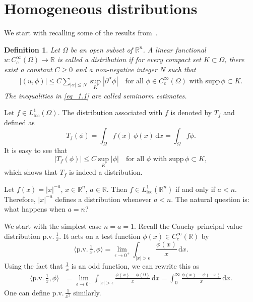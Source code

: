 \documentclass[11pt]{article}
\newtheorem{definition}[theorem]{Definition}
\newcommand{\ssc}[1]{\begin{quotation}\textbf{\color{blue}Suman's comment:\
		}{\color{blue}\textit{#1}}\end{quotation}}
\begin{document}
\section{Homogeneous distributions}\label{appen_homo_dis}
We start with recalling some of the results from~\cite{Dorina,Hormander_I,Taylor_book}.
\begin{definition}\label{def_distribution}
Let $\Omega$ be an open subset of $\mathbb{R}^n$. A linear functional 
$u : C_c^\infty(\Omega) \to \mathbb{R}$ 
is called a \emph{distribution} if for every compact set 
$K \subset \Omega$, there exist a constant $C \ge 0$ 
and a non-negative integer $N$ such that
\begin{align}\label{eq_1.1}
	|(u, \phi)| \le C \sum_{|\alpha|\le N} \sup_{K} | \partial^{\alpha} \phi | 
	\quad \text{for all } \phi \in C_c^\infty(\Omega) \text{ with } \mathrm{supp}\, \phi \subset K.
\end{align}
The inequalities in \eqref{eq_1.1} are called \emph{seminorm estimates}.
\end{definition}
\noindent Let $f \in L^1_{\mathrm{loc}}(\Omega)$. The distribution associated with $f$ is denoted by $T_f$ and defined as 
\begin{equation}\label{def_T_f}
	T_f(\phi) = \int_{\Omega} f(x)\, \phi(x) \, \mathrm{d}x 
	= \int_{\Omega} f \phi.
\end{equation}
It is easy to see that 
\begin{equation}
	|T_f(\phi)| \le C \sup_{K} |\phi| 
	\quad \text{for all } \phi \text{ with } \mathrm{supp}\, \phi \subset K,
\end{equation}
which shows that $T_f$ is indeed a distribution.

Let $f(x) = |x|^{-a}$, $x \in \mathbb{R}^n$, $a \in \mathbb{R}$. 
Then $f \in L^1_{\mathrm{loc}}(\mathbb{R}^n)$ if and only if $a < n$. 
Therefore, $|x|^{-a}$ defines a distribution whenever $a < n$. 
The natural question is: what happens when $a = n$?

We start with the simplest case $n = a = 1$. 
Recall the Cauchy principal value distribution $\mathrm{p.v.}\,\frac{1}{x}$. 
It acts on a test function $\phi(x) \in C_c^\infty(\mathbb{R})$ by
\[
\langle \mathrm{p.v.}\, \tfrac{1}{x}, \phi \rangle 
= \lim_{\epsilon \to 0^+} \int_{|x| > \epsilon} \frac{\phi(x)}{x} \, \mathrm{d}x.
\]
Using the fact that $\frac{1}{x}$ is an odd function, we can rewrite this as
\begin{align*}
    \langle \mathrm{p.v.}\, \tfrac{1}{x}, \phi \rangle 
    &= \lim_{\epsilon \to 0^+} \int_{|x| > \epsilon} \frac{\phi(x) - \phi(0)}{x} \, \mathrm{d}x= \int_0^{\infty} \frac{\phi(x) - \phi(-x)}{x}\, \mathrm{d}x.
\end{align*}
One can define $\mathrm{p.v.}\,\frac{1}{x^2}$ similarly.
\end{document}
